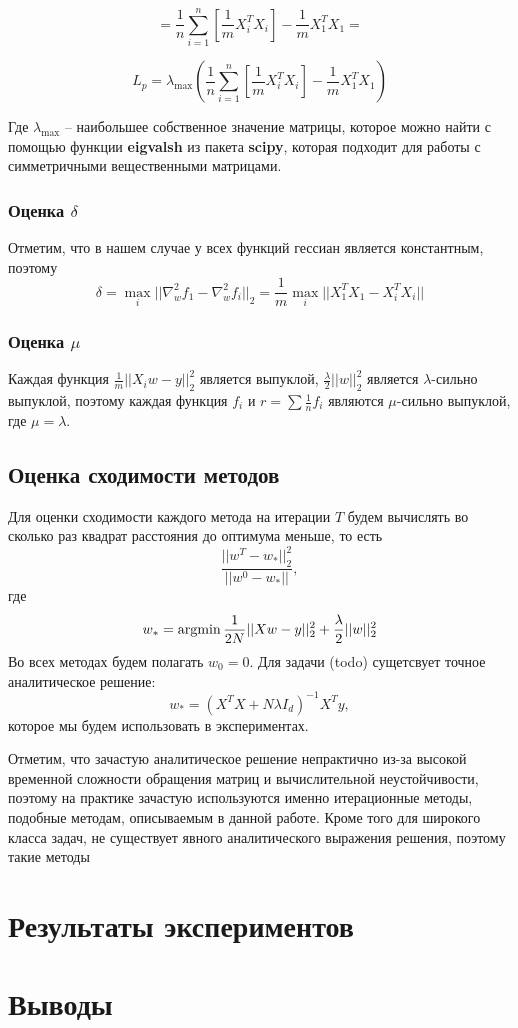 \documentclass[a4paper,12pt]{extarticle}
\newcommand{\argmin}{\mathop{\rm argmin}}
\begin{document}
    \[=\frac{1}{n}\sum_{i = 1}^{n} [\frac{1}{m}X_i^T X_i]- \frac{1}{m} X_1^T X_1 = \]

    \[L_p = \lambda_{\max}(\frac{1}{n}\sum_{i = 1}^{n} [\frac{1}{m}X_i^T X_i]- \frac{1}{m} X_1^T X_1) \]

    Где $\lambda_{\max}$ -- наибольшее собственное значение матрицы,
    которое можно найти с помощью функции \textbf{eigvalsh} из пакета \textbf{scipy},
    которая подходит для работы с симметричными вещественными матрицами. 
     

    
    \subsubsection{Оценка $\delta$}
    Отметим, что в нашем случае у всех функций гессиан является константным, поэтому 
    \[\delta = \max_{i} ||\nabla_{w}^2 f_1 - \nabla_{w}^2 f_i||_2 = \frac{1}{m} \max_{i} ||X_1^T X_1 - X_i^T X_i||\]
    
    \subsubsection{Оценка $\mu$}
    Каждая функция $\frac{1}{m}||X_iw - y||_2^2$ является выпуклой,
    $\frac{\lambda}{2} ||w||_2^2$ является $\lambda$-сильно выпуклой,
    поэтому  каждая функция $f_i$ и $r = \sum\frac{1}{n} f_i$ являются $\mu$-сильно выпуклой,
    где $\mu = \lambda$.

    \subsection{Оценка сходимости методов}
    Для оценки сходимости каждого метода на итерации $T$ будем вычислять во сколько раз квадрат расстояния до оптимума меньше,
    то есть 
    \[\frac{||w^T - w_*||_2^2}{||w^0 - w_*||},\]
    где 
    \[w_* = \argmin \frac{1}{2N}||Xw - y||_2^2 + \frac{\lambda}{2}||w||_2^2\]
    Во всех методах будем полагать $w_0 = 0$.
    Для задачи (todo) сущетсвует точное аналитическое решение:
    \[w_* = (X^T X + N\lambda I_d)^{-1}X^T y,\]
    которое мы будем использовать в экспериментах. 
    
    Отметим, что зачастую аналитическое решение непрактично из-за высокой временной сложности
    обращения матриц и вычислительной неустойчивости, поэтому на практике зачастую используются именно итерационные методы,
    подобные методам, описываемым в данной работе. Кроме того для широкого класса задач,
    не существует явного аналитического выражения решения, поэтому такие методы 

    \section{Результаты экспериментов}

    \section{Выводы}




    
\newpage 
\printbibliography[heading=bibintoc] 
	
\end{document}
